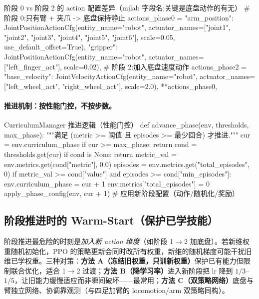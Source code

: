 \begin{codebox}[Python]{阶段 0 vs 阶段 2 的 action 配置差异（mjlab 字段名;关键是底盘动作的有无）}
# 阶段 0:只有臂 + 夹爪 -> 底盘保持静止
actions_phase0 = {
    "arm_position": JointPositionActionCfg(entity_name="robot",
        actuator_names=["joint1", "joint2", "joint3", "joint4", "joint5", "joint6"],
        scale=0.05, use_default_offset=True),
    "gripper": JointPositionActionCfg(entity_name="robot",
        actuator_names=["left_finger_act"], scale=0.02),
}
# 阶段 2:加入底盘速度动作
actions_phase2 = {
    "base_velocity": JointVelocityActionCfg(entity_name="robot",
        actuator_names=["left_wheel_act", "right_wheel_act"], scale=2.0),
    **actions_phase0,
}
\end{codebox}

\paragraph{推进机制：按性能门控，不按步数。}

\begin{codebox}[Python]{CurriculumManager 推进逻辑（性能门控）}
def advance_phase(env, thresholds, max_phase):
    """满足 (metric >= 阈值 且 episodes >= 最少回合) 才推进."""
    cur = env.curriculum_phase
    if cur >= max_phase:
        return
    cond = thresholds.get(cur)
    if cond is None:
        return
    metric_val = env.metrics.get(cond["metric"], 0.0)
    episodes   = env.metrics.get("total_episodes", 0)
    if metric_val >= cond["value"] and episodes >= cond["min_episodes"]:
        env.curriculum_phase = cur + 1
        env.metrics["total_episodes"] = 0
        apply_phase_config(env, cur + 1)   # 应用新阶段配置（动作/随机化/奖励）
\end{codebox}

\subsection{阶段推进时的 Warm-Start（保护已学技能）}
\label{sec:rlmc-wh-warmstart}

阶段推进最危险的时刻是\emph{加入新 action 维度}（如阶段 1$\to$2 加底盘）。若新维权重随机初始化，PPO 的策略更新会同时改所有权重，新维的随机梯度可能干扰旧维已学权重。三种对策：\textbf{方法 A（冻结旧权重，只训新权重）}保护已有能力但限制联合优化，适合 1$\to$2 过渡；\textbf{方法 B（降学习率）}进入新阶段把 lr 降到 $1/3$--$1/5$，让旧能力缓慢适应而非瞬间破坏——最常用；\textbf{方法 C（双策略网络）}底盘与臂独立网络、协调靠观测（与四足加臂的 locomotion/arm 双策略同构）。


